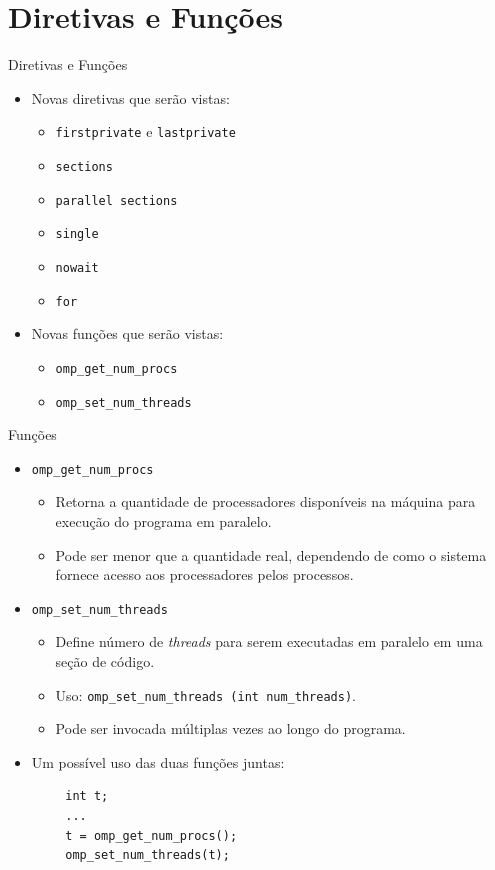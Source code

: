 \section{Diretivas e Funções}

\begin{frame}{Diretivas e Funções}
	\begin{itemize}
		\item Novas diretivas que serão vistas:
		\medskip
		\begin{itemize}
			\item \texttt{firstprivate} e \texttt{lastprivate}
			\medskip
			\item \texttt{sections}
			\medskip
			\item \texttt{parallel sections}
			\medskip
			\item \texttt{single}
			\medskip
			\item \texttt{nowait}
			\medskip
			\item \texttt{for}
		\end{itemize}
		\medskip
		\item Novas funções que serão vistas:
		\medskip
		\begin{itemize}
			\item \texttt{omp\_get\_num\_procs}
			\medskip
			\item \texttt{omp\_set\_num\_threads}
		\end{itemize}
	\end{itemize}
\end{frame}

\begin{frame}[fragile]{Funções}
	\begin{itemize}
		\item \texttt{omp\_get\_num\_procs}
		\medskip
		\begin{itemize}
			\item Retorna a quantidade de processadores disponíveis na máquina para execução do programa em paralelo.
			\smallskip
			\item Pode ser menor que a quantidade real, dependendo de como o sistema fornece acesso aos processadores pelos processos.
		\end{itemize}
		\medskip
		\item \texttt{omp\_set\_num\_threads}
		\begin{itemize}
			\item Define número de \textit{threads} para serem executadas em paralelo em uma seção de código.
			\smallskip
			\item Uso: \texttt{omp\_set\_num\_threads (int num\_threads)}.
			\smallskip
			\item Pode ser invocada múltiplas vezes ao longo do programa.
		\end{itemize}
		\medskip
		\item Um possível uso das duas funções juntas:
	\end{itemize}
	\begin{verbatim}
		int t;
		...
		t = omp_get_num_procs();
		omp_set_num_threads(t);
	\end{verbatim}
\end{frame}

